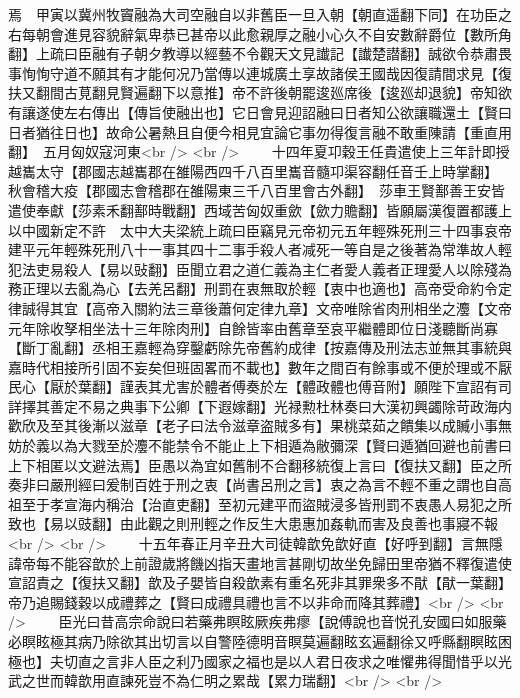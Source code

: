 焉　甲寅以冀州牧竇融為大司空融自以非舊臣一旦入朝【朝直遥翻下同】在功臣之右每朝會進見容貌辭氣卑恭已甚帝以此愈親厚之融小心久不自安數辭爵位【數所角翻】上疏曰臣融有子朝夕教導以經藝不令觀天文見䜟記【䜟楚譛翻】誠欲令恭肅畏事恂恂守道不願其有才能何况乃當傳以連城廣土享故諸侯王國哉因復請間求見【復扶又翻間古莧翻見賢遍翻下以意推】帝不許後朝罷逡廵席後【逡廵却退貌】帝知欲有讓遂使左右傳出【傳旨使融出也】它日會見迎詔融曰日者知公欲讓職還土【賢曰日者猶往日也】故命公暑熱且自便今相見宜論它事勿得復言融不敢重陳請【重直用翻】　五月匈奴寇河東<br />
<br />
　　十四年夏卭穀王任貴遣使上三年計即授越巂太守【郡國志越巂郡在雒陽西四千八百里巂音髓卭渠容翻任音壬上時掌翻】　秋會稽大疫【郡國志會稽郡在雒陽東三千八百里會古外翻】　莎車王賢鄯善王安皆遣使奉獻【莎素禾翻鄯時戰翻】西域苦匈奴重歛【歛力贍翻】皆願屬漢復置都護上以中國新定不許　太中大夫梁統上疏曰臣竊見元帝初元五年輕殊死刑三十四事哀帝建平元年輕殊死刑八十一事其四十二事手殺人者减死一等自是之後著為常準故人輕犯法吏易殺人【易以䜴翻】臣聞立君之道仁義為主仁者愛人義者正理愛人以除殘為務正理以去亂為心【去羌呂翻】刑罰在衷無取於輕【衷中也適也】高帝受命約令定律誠得其宜【高帝入關約法三章後蕭何定律九章】文帝唯除省肉刑相坐之灋【文帝元年除收孥相坐法十三年除肉刑】自餘皆率由舊章至哀平繼體即位日淺聽斷尚寡【斷丁亂翻】丞相王嘉輕為穿鑿虧除先帝舊約成律【按嘉傳及刑法志並無其事統與嘉時代相接所引固不妄矣但班固畧而不載也】數年之間百有餘事或不便於理或不厭民心【厭於葉翻】謹表其尤害於體者傅奏於左【體政體也傅音附】願陛下宣詔有司詳擇其善定不易之典事下公卿【下遐嫁翻】光禄勲杜林奏曰大漢初興蠲除苛政海内歡欣及至其後漸以滋章【老子曰法令滋章盗賊多有】果桃菜茹之饋集以成贓小事無妨於義以為大戮至於灋不能禁令不能止上下相遁為敝彌深【賢曰遁猶回避也前書曰上下相匿以文避法焉】臣愚以為宜如舊制不合翻移統復上言曰【復扶又翻】臣之所奏非曰嚴刑經曰爰制百姓于刑之衷【尚書呂刑之言】衷之為言不輕不重之謂也自高祖至于孝宣海内稱治【治直吏翻】至初元建平而盜賊浸多皆刑罰不衷愚人易犯之所致也【易以豉翻】由此觀之則刑輕之作反生大患惠加姦軌而害及良善也事寢不報<br />
<br />
　　十五年春正月辛丑大司徒韓歆免歆好直【好呼到翻】言無隱諱帝每不能容歆於上前證歲將饑凶指天畫地言甚剛切故坐免歸田里帝猶不釋復遣使宣詔責之【復扶又翻】歆及子嬰皆自殺歆素有重名死非其罪衆多不猒【猒一葉翻】帝乃追賜錢穀以成禮葬之【賢曰成禮具禮也言不以非命而降其葬禮】<br />
<br />
　　臣光曰昔高宗命說曰若藥弗瞑眩厥疾弗瘳【說傅說也音悦孔安國曰如服藥必瞑眩極其病乃除欲其出切言以自警陸德明音瞑莫遍翻眩玄遍翻徐又呼縣翻瞑眩困極也】夫切直之言非人臣之利乃國家之福也是以人君日夜求之唯懼弗得聞惜乎以光武之世而韓歆用直諫死豈不為仁明之累哉【累力瑞翻】<br />
<br />
